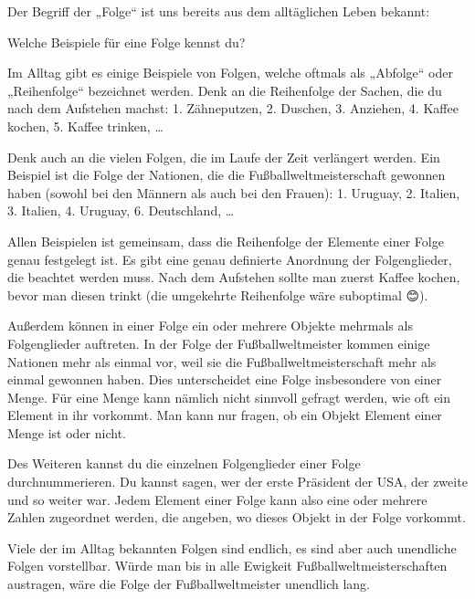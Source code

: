 \documentclass[fontsize=9pt,
               parskip=half-,
               DIV=14,
               listof=chapterentry,
               tocflat]{scrbook}
\begin{document}
Der Begriff der „Folge“ ist uns bereits aus dem alltäglichen Leben bekannt:

\begin{mdframed}[style=semanticbox,frametitleaboveskip=3pt,innerbottommargin=3pt,frametitle=Frage]
Welche Beispiele für eine Folge kennst du?

\end{mdframed}

\begin{answer*}
Im Alltag gibt es einige Beispiele von Folgen, welche oftmals als „Abfolge“ oder „Reihenfolge“ bezeichnet werden. Denk an die Reihenfolge der Sachen, die du nach dem Aufstehen machst: 1. Zähneputzen, 2. Duschen, 3. Anziehen, 4. Kaffee kochen, 5. Kaffee trinken, …

Denk auch an die vielen Folgen, die im Laufe der Zeit verlängert werden. Ein Beispiel ist die Folge der Nationen, die die Fußballweltmeisterschaft gewonnen haben (sowohl bei den Männern als auch bei den Frauen): 1. Uruguay, 2. Italien, 3. Italien, 4. Uruguay, 6. Deutschland, …

\end{answer*}

Allen Beispielen ist gemeinsam, dass die Reihenfolge der Elemente einer Folge genau festgelegt ist. Es gibt eine genau definierte Anordnung der Folgenglieder, die beachtet werden muss. Nach dem Aufstehen sollte man zuerst Kaffee kochen, bevor man diesen trinkt (die umgekehrte Reihenfolge wäre suboptimal {\DejaSans 😊}).

Außerdem können in einer Folge ein oder mehrere Objekte mehrmals als Folgenglieder auftreten. In der Folge der Fußballweltmeister kommen einige Nationen mehr als einmal vor, weil sie die Fußballweltmeisterschaft mehr als einmal gewonnen haben. Dies unterscheidet eine Folge insbesondere von einer Menge. Für eine Menge kann nämlich nicht sinnvoll gefragt werden, wie oft ein Element in ihr vorkommt. Man kann nur fragen, ob ein Objekt Element einer Menge ist oder nicht.

Des Weiteren kannst du die einzelnen Folgenglieder einer Folge durchnummerieren. Du kannst sagen, wer der erste Präsident der USA, der zweite und so weiter war. Jedem Element einer Folge kann also eine oder mehrere Zahlen zugeordnet werden, die angeben, wo dieses Objekt in der Folge vorkommt.

Viele der im Alltag bekannten Folgen sind endlich, es sind aber auch unendliche Folgen vorstellbar. Würde man bis in alle Ewigkeit Fußballweltmeisterschaften austragen, wäre die Folge der Fußballweltmeister unendlich lang.
\end{document}
